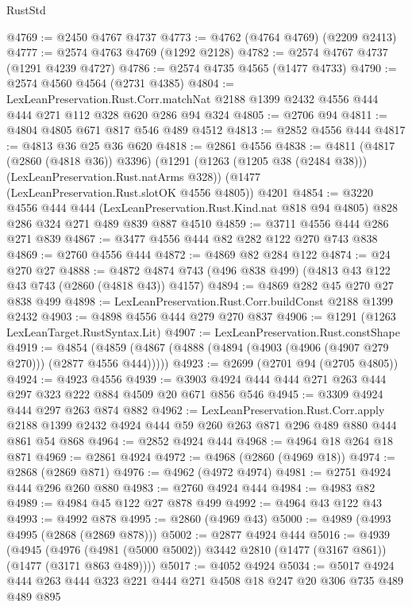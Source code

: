 \begin{lexlean}{RustStd}
\begin{coremodule}
@4769 := @2450 @4767 @4737
@4773 := @4762 (@4764 @4769) (@2209 @2413)
@4777 := @2574 @4763 @4769 (@1292 @2128)
@4782 := @2574 @4767 @4737 (@1291 @4239 @4727)
@4786 := @2574 @4735 @4565 (@1477 @4733)
@4790 := @2574 @4560 @4564 (@2731 @4385)
@4804 := LexLeanPreservation.Rust.Corr.matchNat
    @2188
    @1399
    @2432
    @4556
    @444
    @444
    @271
    @112
    @328
    @620
    @286
    @94
    @324
@4805 := @2706 @94
@4811 := @4804 @4805 @671 @817 @546 @489 @4512
@4813 := @2852 @4556 @444
@4817 := @4813 @36 @25 @36 @620
@4818 := @2861 @4556
@4838 := @4811
    (@4817 (@2860 (@4818 @36)) @3396)
    (@1291 (@1263 (@1205 @38 (@2484 @38))) (LexLeanPreservation.Rust.natArms @328))
    (@1477 (LexLeanPreservation.Rust.slotOK @4556 @4805))
    @4201
@4854 := @3220
    @4556
    @444
    @444
    (LexLeanPreservation.Rust.Kind.nat @818 @94 @4805)
    @828
    @286
    @324
    @271
    @489
    @839
    @887
    @4510
@4859 := @3711 @4556 @444 @286 @271 @839
@4867 := @3477 @4556 @444 @82 @282 @122 @270 @743 @838
@4869 := @2760 @4556 @444
@4872 := @4869 @82 @284 @122
@4874 := @24 @270 @27
@4888 := @4872 @4874 @743 (@496 @838 @499) (@4813 @43 @122 @43 @743 (@2860 (@4818 @43)) @4157)
@4894 := @4869 @282 @45 @270 @27 @838 @499
@4898 := LexLeanPreservation.Rust.Corr.buildConst @2188 @1399 @2432
@4903 := @4898 @4556 @444 @279 @270 @837
@4906 := @1291 (@1263 LexLeanTarget.RustSyntax.Lit)
@4907 := LexLeanPreservation.Rust.constShape
@4919 := @4854 (@4859 (@4867 (@4888 (@4894 (@4903 (@4906 (@4907 @279 @270))) (@2877 @4556 @444)))))
@4923 := @2699 (@2701 @94 (@2705 @4805))
@4924 := @4923 @4556
@4939 := @3903 @4924 @444 @444 @271 @263 @444 @297 @323 @222 @884 @4509 @20 @671 @856 @546
@4945 := @3309 @4924 @444 @297 @263 @874 @882
@4962 := LexLeanPreservation.Rust.Corr.apply
    @2188
    @1399
    @2432
    @4924
    @444
    @59
    @260
    @263
    @871
    @296
    @489
    @880
    @444
    @861
    @54
    @868
@4964 := @2852 @4924 @444
@4968 := @4964 @18 @264 @18 @871
@4969 := @2861 @4924
@4972 := @4968 (@2860 (@4969 @18))
@4974 := @2868 (@2869 @871)
@4976 := @4962 (@4972 @4974)
@4981 := @2751 @4924 @444 @296 @260 @880
@4983 := @2760 @4924 @444
@4984 := @4983 @82
@4989 := @4984 @45 @122 @27 @878 @499
@4992 := @4964 @43 @122 @43
@4993 := @4992 @878
@4995 := @2860 (@4969 @43)
@5000 := @4989 (@4993 @4995 (@2868 (@2869 @878)))
@5002 := @2877 @4924 @444
@5016 := @4939
    (@4945 (@4976 (@4981 (@5000 @5002)) @3442 @2810 (@1477 (@3167 @861)) (@1477 (@3171 @863 @489))))
@5017 := @4052 @4924
@5034 := @5017 @4924 @444 @263 @444 @323 @221 @444 @271 @4508 @18 @247 @20 @306 @735 @489 @489 @895

\end{coremodule}
\end{lexlean}
